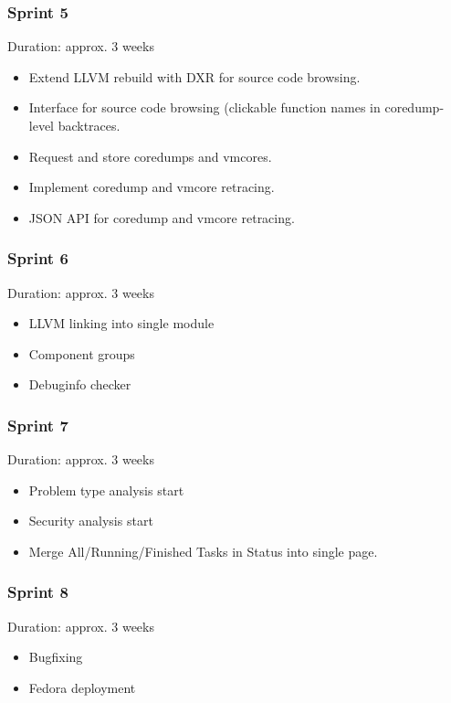 \documentclass{article}
\begin{document}
\cleardoublepage
\subsubsection{Sprint 5}
Duration: approx. 3 weeks

\begin{itemize}
\item Extend LLVM rebuild with DXR for source code browsing.
\item Interface for source code browsing (clickable function names in
  coredump-level backtraces.
\item Request and store coredumps and vmcores.
\item Implement coredump and vmcore retracing.
\item JSON API for coredump and vmcore retracing.
\end{itemize}

\cleardoublepage
\subsubsection{Sprint 6}
Duration: approx. 3 weeks

\begin{itemize}
\item LLVM linking into single module
\item Component groups
\item Debuginfo checker
\end{itemize}

\cleardoublepage
\subsubsection{Sprint 7}
Duration: approx. 3 weeks

\begin{itemize}
\item Problem type analysis start
\item Security analysis start
\item Merge All/Running/Finished Tasks in Status into single page.
\end{itemize}

\cleardoublepage
\subsubsection{Sprint 8}
Duration: approx. 3 weeks

\begin{itemize}
\item Bugfixing
\item Fedora deployment
\end{itemize}
\end{document}
